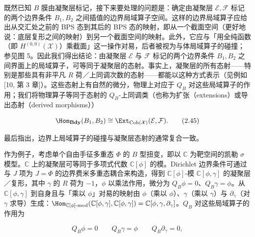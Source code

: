 既然已知 $B$ 膜由凝聚层标记，接下来要处理的问题是：确定由凝聚层 $\mathcal{E},\mathcal{F}$ 标记的两个边界条件 $B_1,B_2$ 之间插值的边界局域算子空间。这样的边界局域算子应给出从交汇处之前的 BPS 态到其后的 BPS 态的映射，即从一个截面空间（更好地说：底层复形之间的映射）到另一个截面空间的映射。此外，它应与「用全纯函数（即 $H^{(0,0)}(\mathcal{X})$）乘截面」这一操作对易，后者被视为与体局域算子的碰撞；参见图 5。因此我们得出结论：由凝聚层 $\mathcal{E}$ 与 $\mathcal{F}$ 标记的两个边界条件 $B_1,B_2$ 之间界面上的局域算子，可等同于凝聚层的态射。事实上，凝聚层的所有态射——特别是那些具有非平凡 $R$ 荷／上同调次数的态射——都能以这种方式表示（见例如 [10, 第 3 章]）。这些态射上有自然的微分，物理上对应于 $Q_B$ 对这些局域算子的作用；我们将物理算子等同于态射的 $Q_B$-上同调类（也称为扩张（extensions）或导出态射（derived morphisms））

\begin{equation}
\Hom_{\mathbf{Bdy}}(B_1,B_2)\cong\Ext_{\operatorname{Coh}(\mathcal{X})}(\mathcal{E},\mathcal{F}).
\tag{2.45}
\end{equation}

最后指出，边界上局域算子的碰撞与凝聚层态射的通常复合一致。

作为例子，考虑单个自由手征多重态 $\Phi$ 的 $B$ 型扭变，即以 $\mathbb{C}$ 为靶空间的凯勒 $\sigma$ 模型。$\mathbb{C}$ 上的凝聚层可等同于多项式代数 $\mathbb{C}[\phi]$ 的模。Dirichlet 边界条件可通过与 $J$ 项为 $J=\Phi$ 的边界费米多重态耦合来构造，得到 $\mathbb{C}[\phi]$-模 $\mathbb{C}[\phi,\gamma]$ 的凝聚层／复形，其中 $\gamma$ 的 $R$ 荷为 $-1$，$\phi$ 以乘法作用，微分为 $Q_B\phi=0$、$Q_B\gamma=\phi$。从 $\mathbb{C}[\phi,\gamma]$ 到自身且与「乘以 $\phi$」对易的映射由 $\phi$（乘以 $\phi$）、$\gamma$（乘以 $\gamma$）与 $\partial_\gamma$（对 $\gamma$ 求导）生成：$\Hom_{\mathbb{C}[\phi]\text{-}\mathrm{mod}}(\mathbb{C}[\phi,\gamma],\mathbb{C}[\phi,\gamma])=\mathbb{C}[\phi,\gamma,\partial_\gamma]$。$Q_B$ 对这些局域算子的作用为

\begin{equation}
Q_B\phi = 0 \qquad Q_B\gamma = \phi \qquad Q_B\partial_\gamma = 0,
\tag{2.46}
\end{equation}
